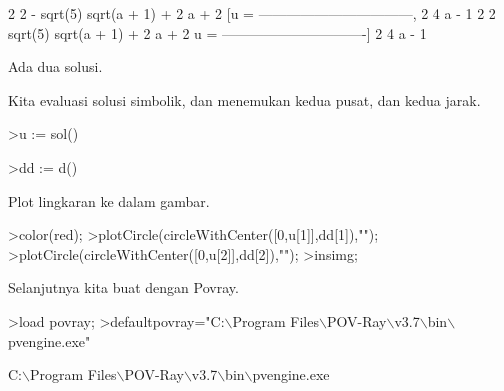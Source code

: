 \documentclass{article}
\begin{document}
\begin{eulernotebook}
\begin{eulercomment}
\begin{eulercomment}
\begin{eulercomment}
\begin{eulercomment}
\begin{euleroutput}
                               2           2
               - sqrt(5) sqrt(a  + 1) + 2 a  + 2
          [u = ---------------------------------, 
                              2
                           4 a  - 1
                                                      2           2
                                        sqrt(5) sqrt(a  + 1) + 2 a  + 2
                                    u = -------------------------------]
                                                      2
                                                   4 a  - 1
  
\end{euleroutput}
\begin{eulercomment}
Ada dua solusi.

Kita evaluasi solusi simbolik, dan menemukan kedua pusat, dan kedua
jarak.
\end{eulercomment}
\begin{eulerprompt}
>u := sol()
\end{eulerprompt}
\begin{euleroutput}
  [0.33333,  1]
\end{euleroutput}
\begin{eulerprompt}
>dd := d()
\end{eulerprompt}
\begin{euleroutput}
  [0.14907,  0.44721]
\end{euleroutput}
\begin{eulercomment}
Plot lingkaran ke dalam gambar.
\end{eulercomment}
\begin{eulerprompt}
>color(red);
>plotCircle(circleWithCenter([0,u[1]],dd[1]),"");
>plotCircle(circleWithCenter([0,u[2]],dd[2]),"");
>insimg;
\end{eulerprompt}
\begin{eulercomment}
Selanjutnya kita buat dengan Povray.
\end{eulercomment}
\begin{eulerprompt}
>load povray;
>defaultpovray="C:\(\backslash\)Program Files\(\backslash\)POV-Ray\(\backslash\)v3.7\(\backslash\)bin\(\backslash\)pvengine.exe"
\end{eulerprompt}
\begin{euleroutput}
  C:\(\backslash\)Program Files\(\backslash\)POV-Ray\(\backslash\)v3.7\(\backslash\)bin\(\backslash\)pvengine.exe
\end{euleroutput}
\begin{eulercomment}

\end{eulercomment}
\end{eulercomment}
\end{eulercomment}
\end{eulercomment}
\end{eulercomment}
\end{eulernotebook}
\end{document}
